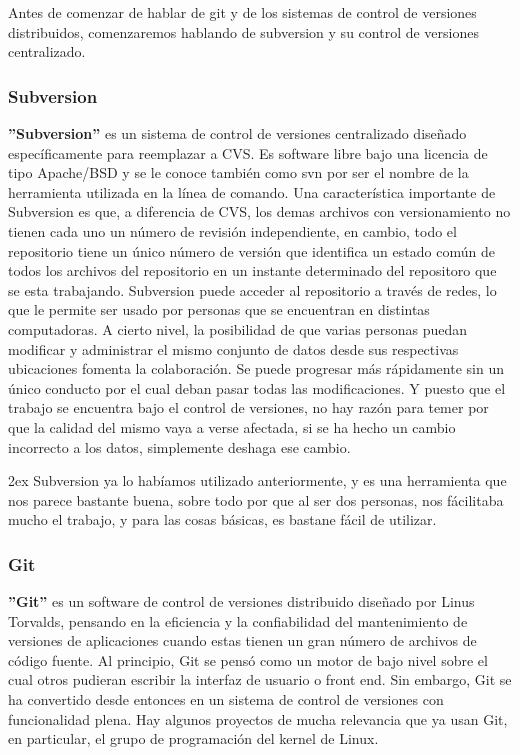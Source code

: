 \documentclass[12pt,a4paper]{report}
\begin{document}
Antes de comenzar de hablar de git y de los sistemas de control de versiones
distribuidos, comenzaremos hablando de subversion y su control de versiones
centralizado. 

\subsubsection{Subversion}

\textbf{''Subversion''} es un sistema de control de versiones centralizado
diseñado
específicamente para reemplazar a CVS. Es software libre bajo una licencia de
tipo Apache/BSD y se le conoce también como svn por ser el nombre de la
herramienta utilizada en la línea de comando.  Una característica importante de
Subversion es que, a diferencia de CVS, los demas archivos con versionamiento no
tienen cada uno un número de revisión independiente, en cambio, todo el
repositorio tiene un único número de versión que identifica un estado común de
todos los archivos del repositorio en un instante determinado del repositoro que
se esta trabajando. Subversion puede acceder al repositorio a través de redes,
lo que le permite ser usado por personas que se encuentran en distintas
computadoras. A cierto nivel, la posibilidad de que varias personas puedan
modificar y administrar el mismo conjunto de datos desde sus respectivas
ubicaciones fomenta la colaboración. Se puede progresar más rápidamente sin un
único conducto por el cual deban pasar todas las modificaciones. Y puesto que el
trabajo se encuentra bajo el control de versiones, no hay razón para temer por
que la calidad del mismo vaya a verse afectada, si se ha hecho un cambio
incorrecto a los datos, simplemente deshaga ese cambio. 

\parskip 2ex Subversion ya lo habíamos utilizado anteriormente, y es una
herramienta que nos parece bastante buena, sobre todo por que al ser dos
personas, nos fácilitaba mucho el trabajo, y para las cosas básicas, es bastane
fácil de utilizar. 


\subsubsection{Git}

\textbf{''Git''} es un software de control de versiones distribuido diseñado por
Linus Torvalds, pensando en la eficiencia y la confiabilidad del mantenimiento
de versiones de aplicaciones cuando estas tienen un gran número de archivos de
código fuente. Al principio, Git se pensó como un motor de bajo nivel sobre el
cual otros pudieran escribir la interfaz de usuario o front end. Sin embargo,
Git se ha convertido desde entonces en un sistema de control de versiones con
funcionalidad plena. Hay algunos proyectos de mucha relevancia que ya usan Git,
en particular, el grupo de programación del kernel de Linux. 
\end{document}
